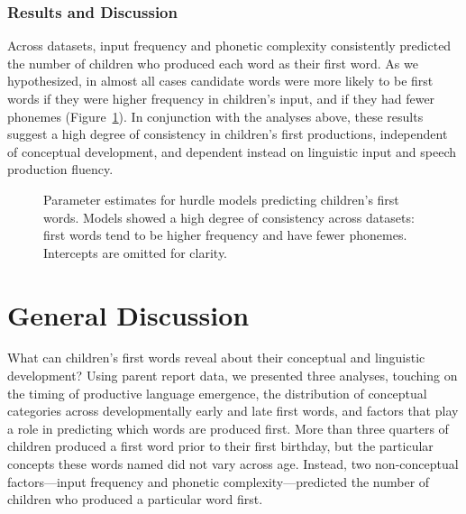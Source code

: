 \documentclass[10pt,letterpaper]{article}
\begin{document}
\subsubsection{Results and Discussion}

Across datasets, input frequency and phonetic complexity consistently predicted the number of children who produced each word as their first word. As we hypothesized, in almost all cases candidate words were more likely to be first words if they were higher frequency in children's input, and if they had fewer phonemes (Figure~\ref{fig:hurdles}). In conjunction with the analyses above, these results suggest a high degree of consistency in children's first productions, independent of conceptual development, and dependent instead on linguistic input and speech production fluency.

\begin{figure}[tb]
\caption{\label{fig:hurdles} Parameter estimates for hurdle models predicting children's first words. Models showed a high degree of consistency across datasets: first words tend to be higher frequency and have fewer phonemes. Intercepts are omitted for clarity.}
\end{figure}

\section{General Discussion}

What can children's first words reveal about their conceptual and linguistic development? Using parent report data, we presented three analyses, touching on the timing of productive language emergence, the distribution of conceptual categories across developmentally early and late first words, and factors that play a role in predicting which words are produced first. More than three quarters of children produced a first word prior to their first birthday, but the particular concepts these words named did not vary across age. Instead, two non-conceptual factors---input frequency and phonetic complexity---predicted the number of children who produced a particular word first.
\end{document}
